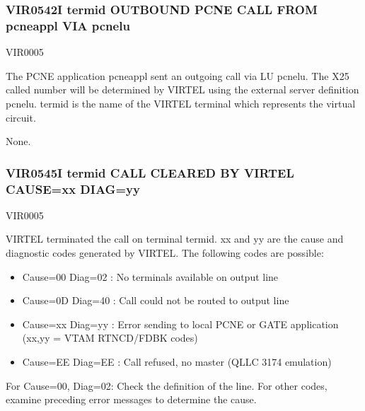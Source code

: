 \documentclass[letterpaper,10pt,english]{sphinxmanual}
\begin{document}
\subsubsection{VIR0542I termid OUTBOUND PCNE CALL FROM pcneappl VIA pcnelu}
\label{\detokenize{messages:vir0542i-termid-outbound-pcne-call-from-pcneappl-via-pcnelu}}\begin{description}
\sphinxAtStartPar
VIR0005

\sphinxAtStartPar
The PCNE application pcneappl sent an outgoing call via LU pcnelu. The X25 called number will be determined by VIRTEL using the external server definition pcnelu. termid is the name of the VIRTEL terminal which represents the virtual circuit.

\sphinxAtStartPar
None.

\end{description}


\subsubsection{VIR0545I termid CALL CLEARED BY VIRTEL CAUSE=xx DIAG=yy}
\label{\detokenize{messages:vir0545i-termid-call-cleared-by-virtel-cause-xx-diag-yy}}\begin{description}
\sphinxAtStartPar
VIR0005

\sphinxAtStartPar
VIRTEL terminated the call on terminal termid. xx and yy are the cause and diagnostic codes generated by VIRTEL. The following codes are possible:
\begin{itemize}
\item {} 
\sphinxAtStartPar
Cause=00 Diag=02 : No terminals available on output line

\item {} 
\sphinxAtStartPar
Cause=0D Diag=40 : Call could not be routed to output line

\item {} 
\sphinxAtStartPar
Cause=xx Diag=yy : Error sending to local PCNE or GATE application (xx,yy = VTAM RTNCD/FDBK codes)

\item {} 
\sphinxAtStartPar
Cause=EE Diag=EE : Call refused, no master (QLLC 3174 emulation)

\end{itemize}

\sphinxAtStartPar
For Cause=00, Diag=02: Check the definition of the line. For other codes, examine preceding error messages to determine the cause.

\end{description}
\end{document}
